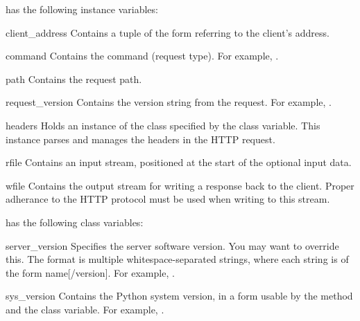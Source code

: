  has the following instance variables:

\begin{datadesc}{client_address}
Contains a tuple of the form  referring
to the client's address.
\end{datadesc}

\begin{datadesc}{command}
Contains the command (request type). For example, .
\end{datadesc}

\begin{datadesc}{path}
Contains the request path.
\end{datadesc}

\begin{datadesc}{request_version}
Contains the version string from the request. For example,
.
\end{datadesc}

\begin{datadesc}{headers}
Holds an instance of the class specified by the 
class variable. This instance parses and manages the headers in
the HTTP request.
\end{datadesc}

\begin{datadesc}{rfile}
Contains an input stream, positioned at the start of the optional
input data.
\end{datadesc}

\begin{datadesc}{wfile}
Contains the output stream for writing a response back to the client.
Proper adherance to the HTTP protocol must be used when writing
to this stream.
\end{datadesc}


 has the following class variables:

\begin{datadesc}{server_version}
Specifies the server software version.  You may want to override
this.
The format is multiple whitespace-separated strings,
where each string is of the form name[/version].
For example, .
\end{datadesc}

\begin{datadesc}{sys_version}
Contains the Python system version, in a form usable by the
 method and the  class
variable. For example, .
\end{datadesc}

